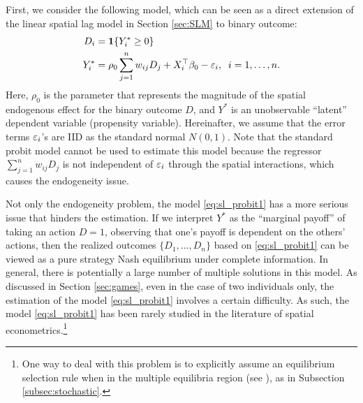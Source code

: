 \documentclass[11pt, A4paper, openany, uplatex]{book}
\begin{document}
First, we consider the following model, which can be seen as a direct extension of the linear spatial lag model in Section \ref{sec:SLM} to binary outcome:
\begin{align}\label{eq:sl_probit1}
\begin{split}
	D_i & = \mathbf{1}\{Y^*_i \geq 0\}\\
	Y^*_i & = \rho_0 \sum_{j = 1}^n w_{ij} D_j + X_i^\top \beta_0 - \varepsilon_i, \;\; i = 1 , \ldots, n.
\end{split}
\end{align}
Here, $\rho_0$ is the parameter that represents the magnitude of the spatial endogenous effect for the binary outcome $D$, and $Y^*$ is an unobservable ``latent'' dependent variable (propensity variable).
Hereinafter, we assume that the error terms $\varepsilon_i$'s are IID as the standard normal $N(0,1)$.
Note that the standard probit model cannot be used to estimate this model because the regressor $\sum_{j = 1}^n w_{ij} D_j$ is not independent of $\varepsilon_i$ through the spatial interactions, which causes the endogeneity issue.

Not only the endogeneity problem, the model \eqref{eq:sl_probit1} has a more serious issue that hinders the estimation.
If we interpret $Y^*$ as the ``marginal payoff'' of taking an action $D = 1$, observing that one's payoff is dependent on the others' actions, then the realized outcomes $\{D_1, \ldots, D_n \}$ based on \eqref{eq:sl_probit1} can be viewed as a pure strategy Nash equilibrium under complete information.
In general, there is potentially a large number of multiple solutions in this model.
As discussed in Section \ref{sec:games}, even in the case of two individuals only, the estimation of the model \eqref{eq:sl_probit1} involves a certain difficulty.
As such, the model \eqref{eq:sl_probit1} has been rarely studied in the literature of spatial econometrics.\footnote{
	One way to deal with this problem is to explicitly assume an equilibrium selection rule when in the multiple equilibria region (see \cite{soetevent2007discrete}), as in Subsection \ref{subsec:stochastic}.
}
\bigskip
\end{document}
